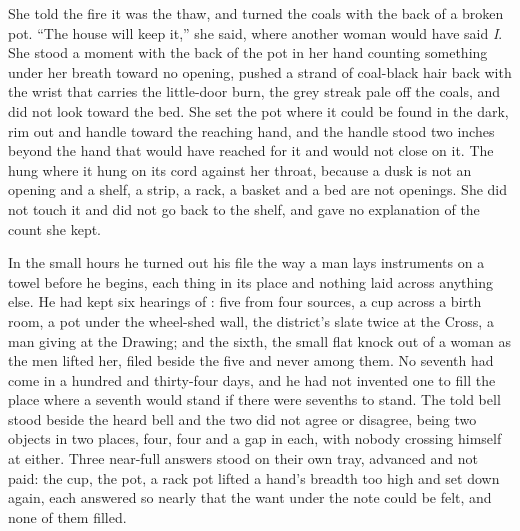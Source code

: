 She told the fire it was the thaw, and turned the coals with the back of a broken pot. “The house will keep it,” she said, where another woman would have said \emph{I}. She stood a moment with the back of the pot in her hand counting something under her breath toward no opening, pushed a strand of coal-black hair back with the wrist that carries the little-door burn, the grey streak pale off the coals, and did not look toward the bed. She set the pot where it could be found in the dark, rim out and handle toward the reaching hand, and the handle stood two inches beyond the hand that would have reached for it and would not close on it. The  hung where it hung on its cord against her throat, because a dusk is not an opening and a shelf, a strip, a rack, a basket and a bed are not openings. She did not touch it and did not go back to the shelf, and gave no explanation of the count she kept.

\scenebreak

In the small hours he turned out his file the way a man lays instruments on a towel before he begins, each thing in its place and nothing laid across anything else. He had kept six hearings of : five from four sources, a cup across a birth room, a pot under the wheel-shed wall, the district's slate twice at the Cross, a man giving at the Drawing; and the sixth, the small flat knock out of a woman as the men lifted her, filed beside the five and never among them. No seventh had come in a hundred and thirty-four days, and he had not invented one to fill the place where a seventh would stand if there were sevenths to stand. The told bell stood beside the heard bell and the two did not agree or disagree, being two objects in two places, four, four and a gap in each, with nobody crossing himself at either. Three near-full answers stood on their own tray, advanced and not paid: the cup, the pot, a rack pot lifted a hand's breadth too high and set down again, each answered so nearly that the want under the note could be felt, and none of them filled.

